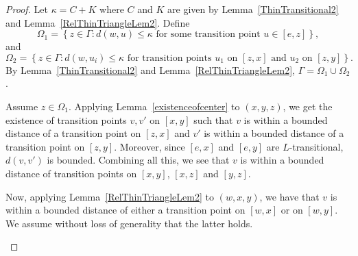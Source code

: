 \documentclass{amsart}
\theoremstyle{definition}
\theoremstyle{remark}
\begin{document}
\begin{proof}
  Let $\kappa =C+K$ where $C$ and $K$ are given by Lemma~\ref{ThinTransitional2} and Lemma~\ref{RelThinTriangleLem2}.  Define
  \[
    \Omega_1 = \left\{ z \in \Gamma \colon d(w, u) \leq \kappa \text{ for some transition point } u \in [e, z] \right\}, 
  \]
  and
  \[
    \Omega_2 = \left\{ z \in \Gamma \colon d(w, u_i) \leq \kappa \text{ for transition points } u_1 \text{ on } [z, x] \text{ and } u_2 \text{ on } [z, y] \right\}.  
  \]
By Lemma~\ref{ThinTransitional2} and Lemma~\ref{RelThinTriangleLem2}, $\Gamma = \Omega_1 \cup \Omega_2$.  

 
Assume $z \in \Omega_1$. Applying Lemma~\ref{existenceofcenter} to $(x,y,z)$, we get the existence of transition points $v,v'$ on $[x,y]$ such that $v$ is within a bounded distance of a transition point on $[z,x]$ and $v'$ is within a bounded distance of a transition point on $[z,y]$.
Moreover, since $[e,x]$ and $[e,y]$ are $L$-transitional, $d(v,v')$ is bounded.
Combining all this, we see that $v$ is within a bounded distance of transition points on $[x,y]$, $[x,z]$ and $[y,z]$.

Now, applying Lemma~\ref{RelThinTriangleLem2} to $(w,x,y)$, we have that $v$ is within a bounded distance of either a transition point on $[w,x]$ or on $[w,y]$. We assume without loss of generality that the latter holds.

  
  \begin{center}
\end{center}






\end{proof}
\end{document}
